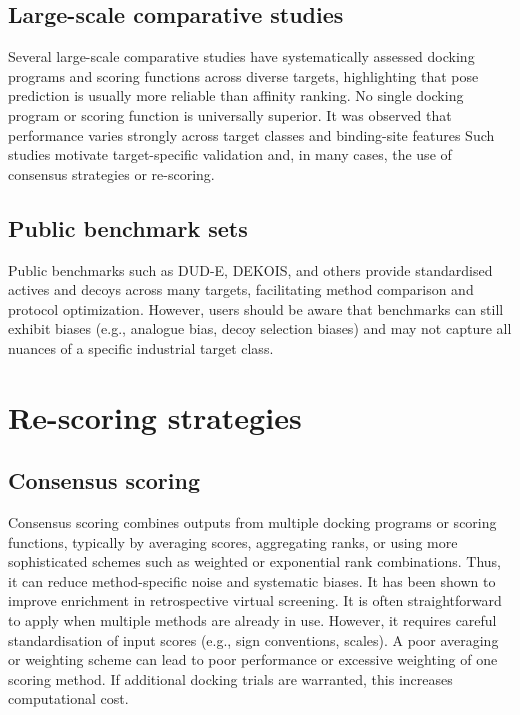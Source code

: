 \documentclass[12pt]{article}
\begin{document}
\subsection{Large-scale comparative studies}

Several large-scale comparative studies\cite{CH8_Warren2006,CH8_Cheng2009,CH8_wang2005} have systematically assessed docking programs and scoring functions across diverse targets, highlighting that pose prediction is usually more reliable than affinity ranking. No single docking program or scoring function is universally superior. It was observed that performance varies strongly across target classes and binding-site features Such studies motivate target-specific validation and, in many cases, the use of consensus strategies or re-scoring.

\subsection{Public benchmark sets}

Public benchmarks such as DUD-E, DEKOIS, and others provide standardised actives and decoys across many targets, facilitating method comparison and protocol optimization\cite{CH8_DUD-E2012}. However, users should be aware that benchmarks can still exhibit biases (e.g., analogue bias, decoy selection biases) and may not capture all nuances of a specific industrial target class.

\section{Re-scoring strategies}

\subsection{Consensus scoring}

Consensus scoring combines outputs from multiple docking programs or scoring functions, typically by averaging scores, aggregating ranks, or using more sophisticated schemes such as weighted or exponential rank combinations\cite{CH8_Cheng2009,CH8_ConsensusDocking2022}. Thus, it can reduce method-specific noise and systematic biases. It has been shown to improve enrichment in retrospective virtual screening. It is often straightforward to apply when multiple methods are already in use.
However, it requires careful standardisation of input scores (e.g., sign conventions, scales). A poor averaging or weighting scheme can lead to poor performance or excessive weighting of one scoring method. If additional docking trials are warranted, this increases computational cost.
\end{document}
